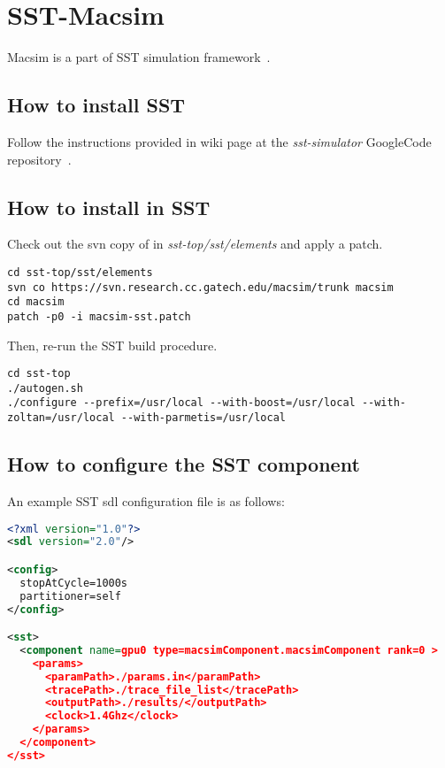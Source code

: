 
\clearpage
\section{SST-Macsim}

Macsim is a part of SST simulation framework~\cite{sst}.

\subsection{How to install SST}

Follow the instructions provided in wiki page at
the \textit{sst-simulator} GoogleCode repository~\cite{sst-google}.

\subsection{How to install \SIM in SST}

Check out the svn copy of \SIM in \textit{sst-top/sst/elements} and
apply a patch. 

\smallskip
\begin{lstlisting}
cd sst-top/sst/elements
svn co https://svn.research.cc.gatech.edu/macsim/trunk macsim
cd macsim
patch -p0 -i macsim-sst.patch
\end{lstlisting}
\smallskip

Then, re-run the SST build procedure.

\smallskip
\begin{lstlisting}
cd sst-top
./autogen.sh
./configure --prefix=/usr/local --with-boost=/usr/local --with-zoltan=/usr/local --with-parmetis=/usr/local
\end{lstlisting}
\smallskip

\subsection{How to configure the \SIM SST component}

An example SST sdl configuration file is as follows:

\smallskip
\begin{lstlisting}[language=xml]
<?xml version="1.0"?>
<sdl version="2.0"/>

<config>
  stopAtCycle=1000s
  partitioner=self
</config>

<sst>
  <component name=gpu0 type=macsimComponent.macsimComponent rank=0 >
    <params>
      <paramPath>./params.in</paramPath>
      <tracePath>./trace_file_list</tracePath>
      <outputPath>./results/</outputPath>
      <clock>1.4Ghz</clock>
    </params>
  </component>
</sst>
\end{lstlisting}
\smallskip

